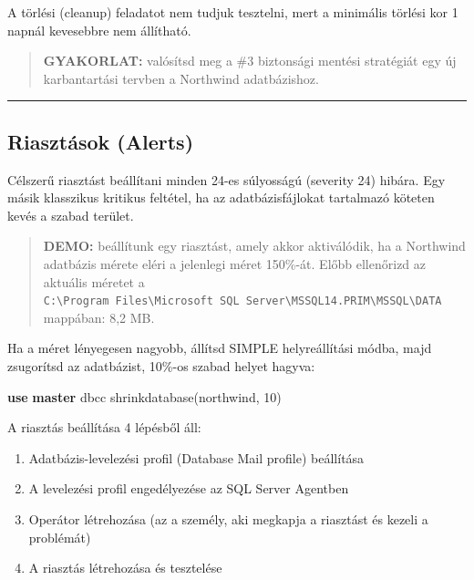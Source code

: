 \documentclass[
  magyar,
]{article}
\newenvironment{Shaded}{}{}
\newcommand{\DecValTok}[1]{\textcolor[rgb]{0.25,0.63,0.44}{#1}}
\newcommand{\KeywordTok}[1]{\textcolor[rgb]{0.00,0.44,0.13}{\textbf{#1}}}
\newcommand{\NormalTok}[1]{#1}
\providecommand{\tightlist}{%
  \setlength{\itemsep}{0pt}\setlength{\parskip}{0pt}}
\begin{document}
A törlési (cleanup) feladatot nem tudjuk tesztelni, mert a minimális
törlési kor 1 napnál kevesebbre nem állítható.

\begin{quote}
\textbf{GYAKORLAT:} valósítsd meg a \#3 biztonsági mentési stratégiát
egy új karbantartási tervben a Northwind adatbázishoz.
\end{quote}

\begin{center}\rule{0.5\linewidth}{0.5pt}\end{center}

\subsection{Riasztások (Alerts)}\label{riasztuxe1sok-alerts}

Célszerű riasztást beállítani minden 24-es súlyosságú (severity 24)
hibára. Egy másik klasszikus kritikus feltétel, ha az adatbázisfájlokat
tartalmazó köteten kevés a szabad terület.

\begin{quote}
\textbf{DEMO:} beállítunk egy riasztást, amely akkor aktiválódik, ha a
Northwind adatbázis mérete eléri a jelenlegi méret 150\%-át. Előbb
ellenőrizd az aktuális méretet a
\texttt{C:\textbackslash{}Program\ Files\textbackslash{}Microsoft\ SQL\ Server\textbackslash{}MSSQL14.PRIM\textbackslash{}MSSQL\textbackslash{}DATA}
mappában: 8,2 MB.
\end{quote}

Ha a méret lényegesen nagyobb, állítsd SIMPLE helyreállítási módba, majd
zsugorítsd az adatbázist, 10\%-os szabad helyet hagyva:

\begin{Shaded}
\begin{Highlighting}[]
\KeywordTok{use} \KeywordTok{master}
\NormalTok{dbcc shrinkdatabase(northwind, }\DecValTok{10}\NormalTok{)}
\end{Highlighting}
\end{Shaded}

A riasztás beállítása 4 lépésből áll:

\begin{enumerate}
\def\labelenumi{\arabic{enumi}.}
\tightlist
\item
  Adatbázis-levelezési profil (Database Mail profile) beállítása
\item
  A levelezési profil engedélyezése az SQL Server Agentben
\item
  Operátor létrehozása (az a személy, aki megkapja a riasztást és kezeli
  a problémát)
\item
  A riasztás létrehozása és tesztelése
\end{enumerate}
\end{document}
